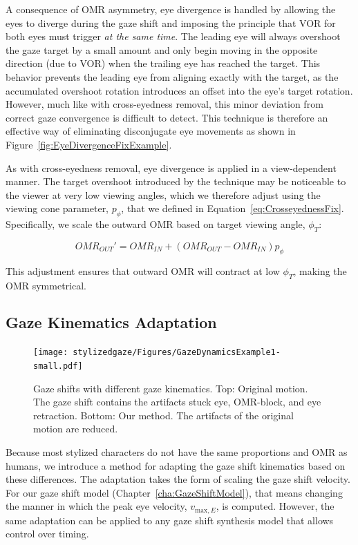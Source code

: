 A consequence of OMR asymmetry, eye divergence is handled by allowing the eyes to diverge during the gaze shift and imposing the principle that VOR for both eyes must trigger \emph{at the same time}. The leading eye will always overshoot the gaze target by a small amount and only begin moving in the opposite direction (due to VOR) when the trailing eye has reached the target. This behavior prevents the leading eye from aligning exactly with the target, as the accumulated overshoot rotation introduces an offset into the eye's target rotation. However, much like with cross-eyedness removal, this minor deviation from correct gaze convergence is difficult to detect. This technique is therefore an effective way of eliminating disconjugate eye movements as shown in Figure~\ref{fig:EyeDivergenceFixExample}.

As with cross-eyedness removal, eye divergence is applied in a view-dependent manner. The target overshoot introduced by the technique may be noticeable to the viewer at very low viewing angles, which we therefore adjust using the viewing cone parameter, $p_{\phi}$, that we defined in Equation~\ref{eq:CrosseyednessFix}. Specifically, we scale the outward OMR based on target viewing angle, $\phi_T$:

\begin{equation}
OMR_{OUT}' = OMR_{IN} + (OMR_{OUT} - OMR_{IN}) p_{\phi}
\end{equation}

This adjustment ensures that outward OMR will contract at low $\phi_T$, making the OMR symmetrical.

\subsection{Gaze Kinematics Adaptation}

\begin{figure}
\centering
\texttt{[image: stylizedgaze/Figures/GazeDynamicsExample1-small.pdf]}
\caption{Gaze shifts with different gaze kinematics. Top: Original motion. The gaze shift contains the artifacts stuck eye, OMR-block, and eye retraction. Bottom: Our method. The artifacts of the original motion are reduced.}
\label{fig:GazeDynamicsExample}
\end{figure}

Because most stylized characters do not have the same proportions and OMR as humans, we introduce a method for adapting the gaze shift kinematics based on these differences. The adaptation takes the form of scaling the gaze shift velocity. For our gaze shift model (Chapter~\ref{cha:GazeShiftModel}), that means changing the manner in which the peak eye velocity, $v_{\mathrm{max},E}$, is computed. However, the same adaptation can be applied to any gaze shift synthesis model that allows control over timing.

